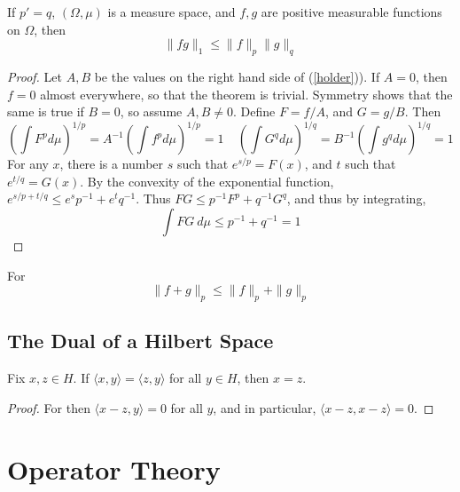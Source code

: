 \begin{theorem}[H\"{o}lder]
    If $p' = q$, $(\Omega,\mu)$ is a measure space, and $f,g$ are positive measurable functions on $\Omega$, then
    \begin{equation} \label{holder} \| fg \|_1 \leq \| f \|_p \| g \|_q \end{equation}
\end{theorem}
\begin{proof}
    Let $A,B$ be the values on the right hand side of (\ref{holder})). If $A = 0$, then $f = 0$ almost everywhere, so that the theorem is trivial. Symmetry shows that the same is true if $B = 0$, so assume $A, B \neq 0$. Define $F = f/A$, and $G = g/B$. Then
    \[ \left( \int F^p d\mu \right)^{1/p} = A^{-1} \left( \int f^p d\mu \right)^{1/p} = 1\ \ \ \ \ \left( \int G^q d\mu \right)^{1/q} = B^{-1} \left( \int g^q d\mu \right)^{1/q} = 1 \]
    For any $x$, there is a number $s$ such that $e^{s/p} = F(x)$, and $t$ such that $e^{t/q} = G(x)$. By the convexity of the exponential function, $e^{s/p + t/q} \leq e^s p^{-1} + e^t q^{-1}$. Thus $FG \leq p^{-1} F^p + q^{-1} G^q$, and thus by integrating,
    \[ \int FG\ d\mu \leq p^{-1} + q^{-1} = 1 \]
\end{proof}

\begin{corollary}[Minkowski]
    For
    \[ \| f + g \|_p \leq \| f \|_p + \| g \|_p \]
\end{corollary}






\section{The Dual of a Hilbert Space}

\begin{lemma}
    Fix $x,z \in H$. If $\langle x, y \rangle = \langle z, y \rangle$ for all $y \in H$, then $x = z$.
\end{lemma}
\begin{proof}
    For then $\langle x - z, y \rangle = 0$ for all $y$, and in particular, $\langle x - z, x - z \rangle = 0$.
\end{proof}





\chapter{Operator Theory}

